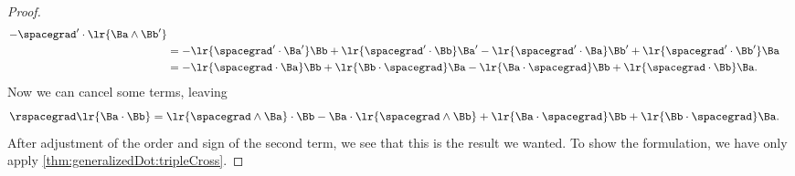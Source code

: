 \begin{proof}
\begin{equation}
\begin{aligned}
- \spacegrad' \cdot \lr{ \Ba \wedge \Bb' } \\
&=
- \lr{ \spacegrad' \cdot \Ba' } \Bb
+ \lr{ \spacegrad' \cdot \Bb } \Ba'
- \lr{ \spacegrad' \cdot \Ba } \Bb'
+ \lr{ \spacegrad' \cdot \Bb' } \Ba
\\
&=
- \lr{ \spacegrad \cdot \Ba } \Bb
+ \lr{ \Bb \cdot \spacegrad } \Ba
- \lr{ \Ba \cdot \spacegrad } \Bb
+ \lr{ \spacegrad \cdot \Bb } \Ba.
\end{aligned}
\end{equation}
Now we can cancel some terms, leaving
\begin{equation}\label{eqn:vectorcalc:800}
\begin{aligned}
\rspacegrad \lr{ \Ba \cdot \Bb }
&=
\lr{ \spacegrad \wedge \Ba} \cdot \Bb
-
\Ba \cdot \lr{ \spacegrad \wedge \Bb }
+ \lr{ \Ba \cdot \spacegrad } \Bb
+ \lr{ \Bb \cdot \spacegrad } \Ba.
\end{aligned}
\end{equation}
After adjustment of the order and sign of the second term, we see that this is the result we wanted.  To show the  formulation, we have only apply \cref{thm:generalizedDot:tripleCross}.
\end{proof}

